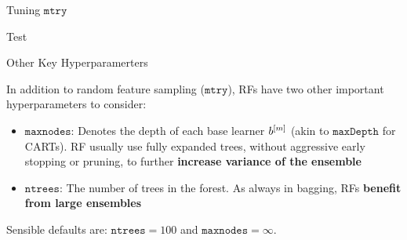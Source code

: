 \documentclass[11pt,compress,t,notes=noshow, xcolor=table]{beamer}
\begin{document}
\begin{vbframe}{Tuning $\texttt{mtry}$}

Test

\end{vbframe}

\begin{vbframe}{Other Key Hyperparamerters}

In addition to random feature sampling ($\texttt{mtry}$), RFs have two other important hyperparameters to consider:

\begin{itemize}
  \item $\texttt{maxnodes}$: Denotes the depth of each base learner $b^{[m]}$ (akin to $\texttt{maxDepth}$ for CARTs). RF usually use fully expanded trees, without aggressive early stopping or pruning, to further \textbf{increase variance of the ensemble} 
  \item $\texttt{ntrees}$: The number of trees in the forest. As always in bagging, RFs \textbf{benefit from large ensembles} 
\end{itemize}

Sensible defaults are: $\texttt{ntrees} = 100$ and $\texttt{maxnodes} = \infty$.

\end{vbframe}
\end{document}
